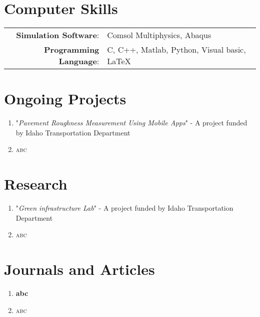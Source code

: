 \documentclass[a4paper,10pt]{article}
\begin{document}
\section{Computer Skills}
\begin{tabular}{rl}
 \textbf{Simulation Software}:& Comsol Multiphysics, Abaqus\\
\textbf{Programming Language}:& C, C++, Matlab, Python, Visual basic, \LaTeX\\
\end{tabular}

\newpage
\section{Ongoing Projects}
\begin{enumerate}
	\item"\textit{Pavement Roughness Measurement Using Mobile Apps}" - A project funded by Idaho Transportation Department
	\item\textsc{abc}
\end{enumerate}
\section{Research}
\begin{enumerate}
	\item"\textit{Green infrastructure Lab}" - A project funded by Idaho Transportation Department
	\item\textsc{abc}
\end{enumerate}
\section{Journals and Articles}
\begin{enumerate}
	\item\textbf{abc}
	\item\textsc{abc}
\end{enumerate}
\end{document}
